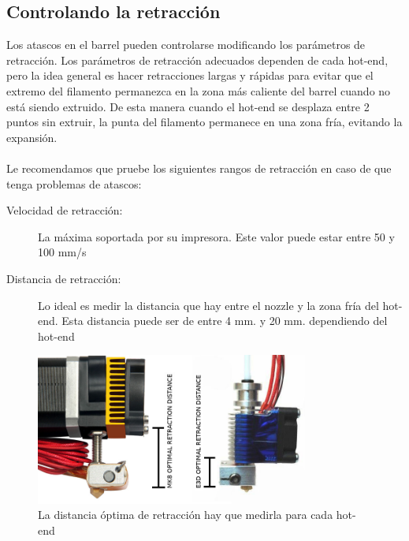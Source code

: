 \documentclass[11pt,a4paper]{article}
\begin{document}
	\subsection{Controlando la retracción}
Los atascos en el barrel pueden controlarse modificando los parámetros de retracción. Los parámetros de retracción adecuados dependen de cada hot-end, pero la idea general es hacer retracciones largas y rápidas para evitar que el extremo del filamento permanezca en la zona más caliente del barrel cuando no está siendo extruido. De esta manera cuando el hot-end se desplaza entre 2 puntos sin extruir, la punta del filamento permanece en una zona fría, evitando la expansión.\\\\
Le recomendamos que pruebe los siguientes rangos de retracción en caso de que tenga problemas de atascos:	\begin{description}
		\item[Velocidad de retracción:] La máxima soportada por su impresora. Este valor puede estar entre 50 y 100 mm/s 
		\item[Distancia de retracción:] Lo ideal es medir la distancia que hay entre el nozzle y la zona fría del hot-end. Esta distancia puede ser de entre 4 mm. y 20 mm. dependiendo del hot-end 
	\end{description}
\begin{figure}[H]
\centering
\includegraphics[width=0.8\textwidth,cfbox=azul_marcos 4pt 0pt]{FOTOS/RETRACTION}
\caption*{La distancia óptima de retracción hay que medirla para cada hot-end}
\end{figure}
\end{document}
